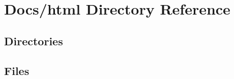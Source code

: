 \section{Docs/html Directory Reference}
\label{dir_1db84d1af81ec941ad0c5d401eba4310}
\subsection*{Directories}
\begin{DoxyCompactItemize}
\end{DoxyCompactItemize}
\subsection*{Files}
\begin{DoxyCompactItemize}
\end{DoxyCompactItemize}
